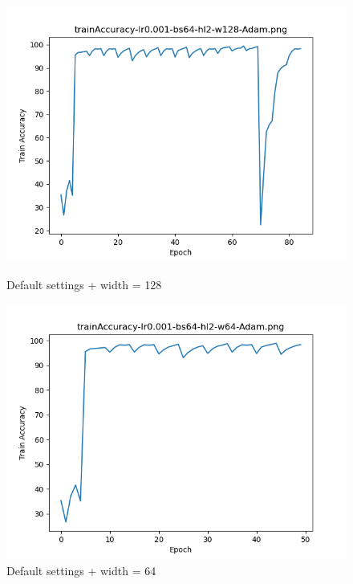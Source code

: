 \documentclass{article}[12pt]
\begin{document}
    \begin{figure}[H]
        \includegraphics[width=\linewidth]{testsResults/trainAccuracy/def.png}
        \caption{Default settings + width = 128}
        \endminipage\hfill
        \includegraphics[width=\linewidth]{testsResults/trainAccuracy/trainAccuracy-lr0.001-bs64-hl2-w64-Adam.png}
        \caption{Default settings + width = 64}
        \endminipage
    \end{figure}
\end{document}
